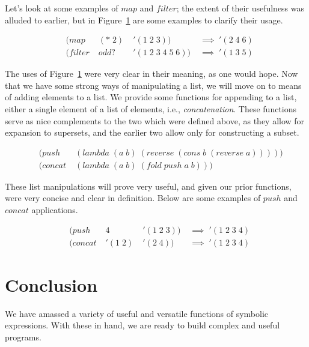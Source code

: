 Let's look at some examples of $map$ and $filter$; the extent of their
usefulness was alluded to earlier, but in Figure~\ref{fig:mapAndFilterExamples}
are some examples to clarify their usage.

\begin{figure}[htp]
\caption{}\label{fig:mapAndFilterExamples}
\begin{align*}
& (map \; &(* \; 2) \; &'(1 \; 2 \; 3)) \; &\implies \; '(2 \; 4 \; 6)
\\& (filter \; &odd? \; &'(1 \; 2 \; 3 \; 4 \; 5 \; 6)) \; &\implies \; '(1 \; 3 \; 5)
\end{align*}
\end{figure}

The uses of Figure~\ref{fig:mapAndFilterExamples} were very clear in their
meaning, as one would hope. Now that we have some strong ways of manipulating a
list, we will move on to means of adding elements to a list. We provide some
functions for appending to a list, either a single element of a list of
elements, i.e., \emph{concatenation}. These functions serve as nice complements to
the two which were defined above, as they allow for expansion to supersets, and
the earlier two allow only for constructing a subset.

\begin{figure}[htp]
\caption{}\label{fig:pushAndConcatDefs}
\begin{align*}
& (push \; &(lambda \; (a \; b) \; (reverse \; (cons \; b \; (reverse \; a)))))
\\& (concat \; &(lambda \; (a \; b) \; (fold \; push \; a \; b)))
\end{align*}
\end{figure}

These list manipulations will prove very useful, and given our prior functions, 
were very concise and clear in definition. Below are some examples of $push$ and 
$concat$ applications.

\begin{figure}[htp]
\caption{}\label{fig:pushAndConcatExamples}
\begin{align*}
& (push \; &4 \; &'(1 \; 2 \; 3)) \; &\implies \; '(1 \; 2 \; 3 \; 4)
\\& (concat \; &'(1 \; 2) \; &'(2 \; 4)) \; &\implies \; '(1 \; 2 \; 3 \; 4)
\end{align*}
\end{figure}

\section{Conclusion}
We have amassed a variety of useful and versatile functions of symbolic 
expressions. With these in hand, we are ready to build complex and useful 
programs.
